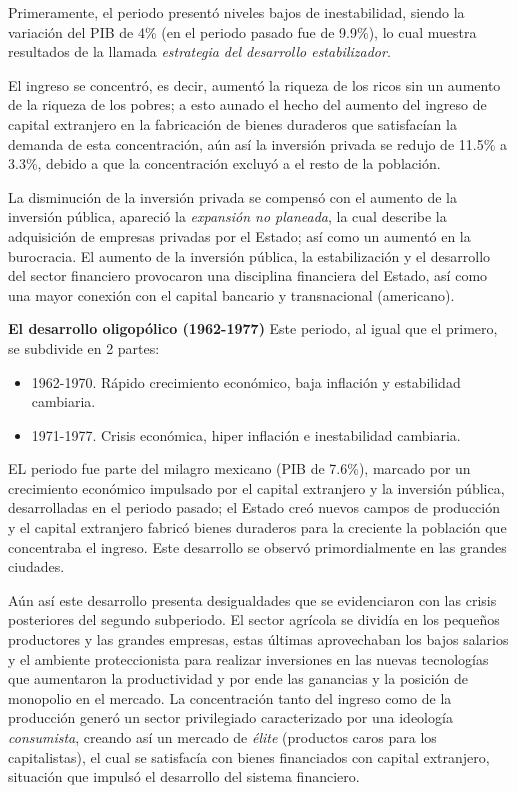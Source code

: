 Primeramente, el periodo presentó niveles bajos de inestabilidad, siendo la variación del PIB de 4\% (en el periodo pasado fue de 9.9\%), lo cual muestra resultados de la llamada \textit{estrategia del desarrollo estabilizador}.


El ingreso se concentró, es decir, aumentó la riqueza de los ricos sin un aumento de la riqueza de los pobres; a esto aunado el hecho del aumento del ingreso de capital extranjero en la fabricación de bienes duraderos que satisfacían la demanda de esta concentración, aún así la inversión privada se redujo de 11.5\% a 3.3\%, debido a que la concentración excluyó a el resto de la población.

La disminución de la inversión privada se compensó con el aumento de la inversión pública, apareció la \textit{expansión no planeada}, la cual describe la adquisición de empresas privadas por el Estado; así como un aumentó en la burocracia. El aumento de la inversión pública, la estabilización y el desarrollo del sector financiero provocaron una disciplina financiera del Estado, así como una mayor conexión con el capital bancario y transnacional (americano).

\textbf{El desarrollo oligopólico (1962-1977)}
Este periodo, al igual que el primero, se subdivide en 2 partes:
\begin{itemize}
    \item 1962-1970. Rápido crecimiento económico, baja inflación y estabilidad cambiaria.
    \item 1971-1977. Crisis económica, hiper inflación e inestabilidad cambiaria.
\end{itemize}

EL periodo fue parte del milagro mexicano (PIB de 7.6\%), marcado por un crecimiento económico impulsado por el capital extranjero y la inversión pública, desarrolladas en el periodo pasado; el Estado creó nuevos campos de producción y el capital extranjero fabricó bienes duraderos para la creciente la población que concentraba el ingreso. Este desarrollo se observó primordialmente en las grandes ciudades.

Aún así este desarrollo presenta desigualdades que se evidenciaron con las crisis posteriores del segundo subperiodo. El sector agrícola se dividía en los pequeños productores y las grandes empresas, estas últimas aprovechaban los bajos salarios y el ambiente proteccionista para realizar inversiones en las nuevas tecnologías que aumentaron la productividad y por ende las ganancias y la posición de monopolio en el mercado.
La concentración tanto del ingreso como de la producción generó un sector privilegiado caracterizado por una ideología \textit{consumista}, creando así un mercado de \textit{élite} (productos caros para los capitalistas), el cual se satisfacía con bienes financiados con capital extranjero, situación que impulsó el desarrollo del sistema financiero.

